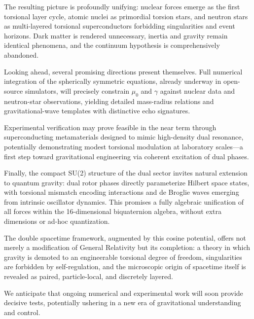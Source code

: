 \documentclass[a4paper]{article}
\begin{document}
The resulting picture is profoundly unifying: nuclear forces emerge as the first torsional layer cycle, atomic nuclei as primordial torsion stars, and neutron stars as multi-layered torsional superconductors forbidding singularities and event horizons. Dark matter is rendered unnecessary, inertia and gravity remain identical phenomena, and the continuum hypothesis is comprehensively abandoned.

Looking ahead, several promising directions present themselves. Full numerical integration of the spherically symmetric equations, already underway in open-source simulators, will precisely constrain $\mu_0$ and $\gamma$ against nuclear data and neutron-star observations, yielding detailed mass-radius relations and gravitational-wave templates with distinctive echo signatures.

Experimental verification may prove feasible in the near term through superconducting metamaterials designed to mimic high-density dual resonance, potentially demonstrating modest torsional modulation at laboratory scales—a first step toward gravitational engineering via coherent excitation of dual phases.

Finally, the compact SU(2) structure of the dual sector invites natural extension to quantum gravity: dual rotor phases directly parameterize Hilbert space states, with torsional mismatch encoding interactions and de Broglie waves emerging from intrinsic oscillator dynamics. This promises a fully algebraic unification of all forces within the 16-dimensional biquaternion algebra, without extra dimensions or ad-hoc quantization.

The double spacetime framework, augmented by this cosine potential, offers not merely a modification of General Relativity but its completion: a theory in which gravity is demoted to an engineerable torsional degree of freedom, singularities are forbidden by self-regulation, and the microscopic origin of spacetime itself is revealed as paired, particle-local, and discretely layered.

We anticipate that ongoing numerical and experimental work will soon provide decisive tests, potentially ushering in a new era of gravitational understanding and control.


\end{document}
